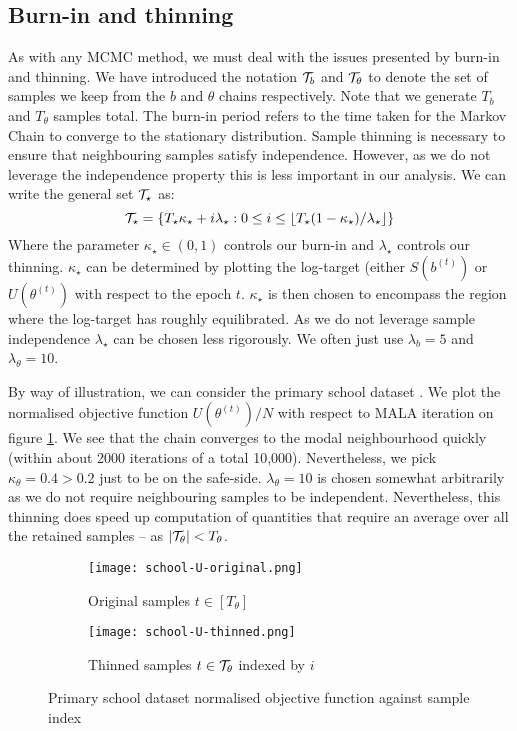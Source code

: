 \subsection{Burn-in and thinning}
\label{appdx:burn-in-thinning}

As with any MCMC method, we must deal with the issues presented by burn-in and thinning. We have introduced the notation $\mathcal{T}_b$ and $\mathcal{T}_\theta$ to denote the set of samples we keep from the $b$ and $\theta$ chains respectively. Note that we generate $T_b$ and $T_\theta$ samples total. The burn-in period refers to the time taken for the Markov Chain to converge to the stationary distribution. Sample thinning is necessary to ensure that neighbouring samples satisfy independence. However, as we do not leverage the independence property this is less important in our analysis. We can write the general set $\mathcal{T}_\star$ as:
%
\begin{equation}
	\mathcal{T}_\star = \{T_\star \kappa_\star + i \lambda_\star :  
	0 \leq i \leq \lfloor T_\star(1 - \kappa_\star) / \lambda_\star \rfloor \}
\end{equation}
%
Where the parameter $\kappa_\star \in (0, 1)$ controls our burn-in and $\lambda_\star$ controls our thinning. $\kappa_\star$ can be determined by plotting the log-target (either $S(b^{(t)})$ or $U(\theta^{(t)})$ with respect to the epoch $t$. $\kappa_\star$ is then chosen to encompass the region where the log-target has roughly equilibrated. As we do not leverage sample independence $\lambda_\star$ can be chosen less rigorously. We often just use $\lambda_b=5$ and $\lambda_\theta = 10$.

By way of illustration, we can consider the primary school dataset \cite{schools}. We plot the normalised objective function $U\left( \theta^{(t)} \right) / N$ with respect to MALA iteration on figure \ref{fig:school-U-orginal}. We see that the chain converges to the modal neighbourhood quickly (within about 2000 iterations of a total 10,000). Nevertheless, we pick $\kappa_\theta=0.4 > 0.2$ just to be on the safe-side. $\lambda_\theta=10$ is chosen somewhat arbitrarily as we do not require neighbouring samples to be independent. Nevertheless, this thinning does speed up computation of quantities that require an average over all the retained samples -- as $|\mathcal{T}_\theta| < T_\theta$.
%
\begin{figure}[!h]
	\centering
	\begin{subfigure}[t]{0.4\linewidth}
		\centering
		\texttt{[image: school-U-original.png]}
		\caption{Original samples $t \in [T_\theta]$}
		\label{fig:school-U-orginal}
	\end{subfigure}
	\begin{subfigure}[t]{0.4\linewidth}
		\centering
		\texttt{[image: school-U-thinned.png]}
		\caption{Thinned samples $t \in \mathcal{T}_\theta$ indexed by $i$}
		\label{fig:school-U-thinned}
	\end{subfigure}
	\hspace{1cm}
	\caption{Primary school dataset normalised objective function against sample index}
\end{figure}


